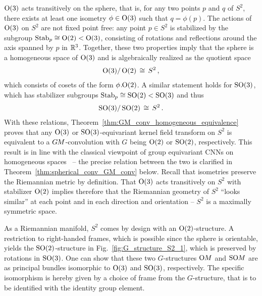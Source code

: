 $\operatorname{O}(3)$ acts transitively on the sphere, that is, for any two points $p$ and $q$ of $S^2$, there exists at least one isometry $\phi\in\operatorname{O}(3)$ such that $q = \phi(p)$.
The actions of $\operatorname{O}(3)$ on $S^2$ are not fixed point free:
any point $p\in S^2$ is stabilized by the subgroup $\operatorname{Stab}_{p} \cong \operatorname{O}(2) < \operatorname{O}(3)$, consisting of rotations and reflections around the axis spanned by $p$ in $\mathbb{R}^3$.
Together, these two properties imply that the sphere is a homogeneous space of $\operatorname{O}(3)$ and is algebraically realized as the quotient space
\begin{align}
    \operatorname{O}(3)/\operatorname{O}(2) \,\cong\, S^2 \,,
\end{align}
which consists of cosets of the form ${\phi\mkern1mu.\mkern-4mu\operatorname{O}(2)}$.
A similar statement holds for $\operatorname{SO}(3)$, which has stabilizer subgroups $\operatorname{Stab}_{p} \cong \operatorname{SO}(2) < \operatorname{SO}(3)$ and thus
\begin{align}
    \operatorname{SO}(3)/\operatorname{SO}(2) \,\cong\, S^2 \,.
\end{align}
With these relations, Theorem~\ref{thm:GM_conv_homogeneous_equivalence} proves that any $\operatorname{O}(3)$ or $\operatorname{SO}(3)$-equivariant kernel field transform on $S^2$ is equivalent to a $G\mkern-1.4muM$-convolution with $G$ being $\operatorname{O}(2)$ or $\operatorname{SO}(2)$, respectively.
This result is in line with the classical viewpoint of group equivariant CNNs on homogeneous spaces~\cite{Cohen2019-generaltheory} -- the precise relation between the two is clarified in Theorem~\ref{thm:spherical_conv_GM_conv} below.
Recall that isometries preserve the Riemannian metric by definition.
That $\operatorname{O}(3)$ acts transitively on $S^2$ with stabilizer $\operatorname{O}(2)$ implies therefore that the Riemannian geometry of $S^2$ ``looks similar'' at each point and in each direction and orientation -- $S^2$ is a maximally symmetric space.


As a Riemannian manifold, $S^2$ comes by design with an $\operatorname{O}(2)$-structure.
A restriction to right-handed frames, which is possible since the sphere is orientable, yields the $\operatorname{SO}(2)$-structure in Fig.~\ref{fig:G_structure_S2_1}, which is preserved by rotations in $\operatorname{SO}(3)$.
One can show that these two $G$-structures $\operatorname{O}\mkern-3.6muM$ and $\operatorname{SO}\mkern-3.6muM$ are as principal bundles isomorphic to $\operatorname{O}(3)$ and $\operatorname{SO}(3)$, respectively.
The specific isomorphism is hereby given by a choice of frame from the $G$-structure, that is to be identified with the identity group element.


